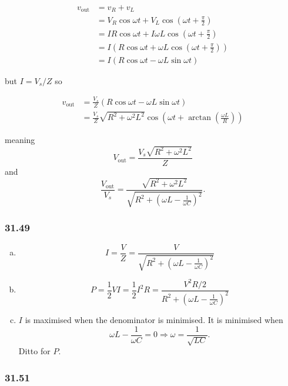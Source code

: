 \documentclass{article}
\begin{document}
\begin{align*}
  v_\text{out} & = v_R + v_L                                                                                \\
               & = V_R \cos \omega t + V_L \cos \left( \omega t + \frac{\pi}{2} \right)                     \\
               & = I R \cos \omega t + I \omega L \cos \left( \omega t + \frac{\pi}{2} \right)              \\
               & = I \left( R \cos \omega t + \omega L \cos \left( \omega t + \frac{\pi}{2} \right) \right) \\
               & = I \left( R \cos \omega t - \omega L \sin \omega t \right)
\end{align*}

but $I = V_s / Z$ so

\begin{align*}
  v_\text{out} & = \frac{V_s}{Z} (R \cos \omega t - \omega L \sin \omega t)                                                         \\
               & = \frac{V_s}{Z} \sqrt{R^2 + \omega^2 L^2} \cos \left( \omega t + \arctan \left( \frac{\omega L}{R} \right) \right)
\end{align*}

meaning \[V_\text{out} = \frac{V_s \sqrt{R^2 + \omega^2 L^2}}{Z}\] and \[\frac{V_\text{out}}{V_s} = \frac{\sqrt{R^2 + \omega^2 L^2}}{\sqrt{R^2 + \left( \omega L - \frac{1}{\omega C} \right)^2}}.\]

\subsubsection{31.49}

\begin{enumerate}[(a)]
  \item \[I = \frac{V}{Z} = \frac{V}{\sqrt{R^2 + \left( \omega L - \frac{1}{\omega C} \right)^2}}\]

  \item \[P = \frac{1}{2} V I = \frac{1}{2} I^2 R = \frac{V^2 R / 2}{R^2 + \left( \omega L - \frac{1}{\omega C} \right)^2}\]

  \item $I$ is maximised when the denominator is minimised. It is minimised when \[\omega L - \frac{1}{\omega C} = 0 \Rightarrow \omega = \frac{1}{\sqrt{L C}}.\] Ditto for $P$.
\end{enumerate}

\subsubsection{31.51}
\end{document}
